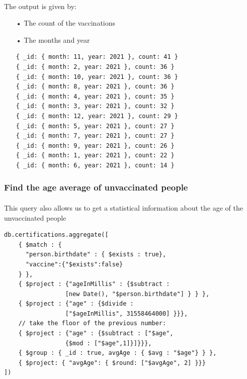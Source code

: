 \documentclass[a4paper,12pt]{article}
\begin{document}
\paragraph{} The output is given by: 
\begin{itemize}[noitemsep]
\item[•] The count of the vaccinations
\item[•] The months and year
\begin{tcolorbox}[colback=red!5!white,colframe=red!75!black,title=OUTPUT]
\begin{verbatim}
{ _id: { month: 11, year: 2021 }, count: 41 }
{ _id: { month: 2, year: 2021 }, count: 36 }
{ _id: { month: 10, year: 2021 }, count: 36 }
{ _id: { month: 8, year: 2021 }, count: 36 }
{ _id: { month: 4, year: 2021 }, count: 35 }
{ _id: { month: 3, year: 2021 }, count: 32 }
{ _id: { month: 12, year: 2021 }, count: 29 }
{ _id: { month: 5, year: 2021 }, count: 27 }
{ _id: { month: 7, year: 2021 }, count: 27 }
{ _id: { month: 9, year: 2021 }, count: 26 }
{ _id: { month: 1, year: 2021 }, count: 22 }
{ _id: { month: 6, year: 2021 }, count: 14 }
\end{verbatim}
\end{tcolorbox}

\end{itemize}
\subsubsection{Find the age average of unvaccinated people}
\paragraph{} This query also allows us to get a statistical information about the age of the unvaccinated people
\begin{tcolorbox}[colback=green!5!white,colframe=green!75!black,title=QUERY]
\begin{verbatim}
db.certifications.aggregate([
    { $match : { 
      "person.birthdate" : { $exists : true},
      "vaccine":{"$exists":false}
    } },
    { $project : {"ageInMillis" : {$subtract : 
                 [new Date(), "$person.birthdate"] } } }, 
    { $project : {"age" : {$divide : 
                 ["$ageInMillis", 31558464000] }}},
    // take the floor of the previous number:
    { $project : {"age" : {$subtract : ["$age", 
                 {$mod : ["$age",1]}]}}},
    { $group : { _id : true, avgAge : { $avg : "$age"} } },
    { $project: { "avgAge": { $round: ["$avgAge", 2] }}}
])
\end{verbatim}
\end{tcolorbox}
\end{document}
